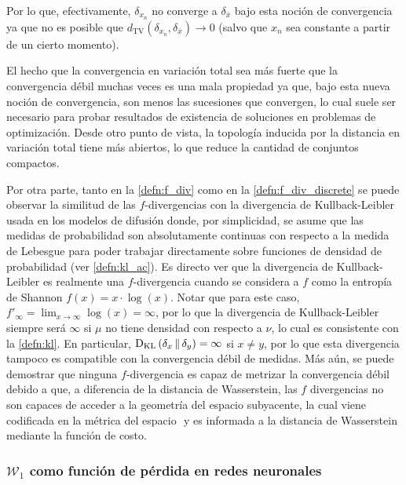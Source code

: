 Por lo que, efectivamente, $\delta_{x_n}$ no converge a $\delta_{\bar x}$ bajo esta noción de convergencia ya que no es posible que $d_{\operatorname{TV}}(\delta_{x_n},\delta_{\bar x})\to 0$ (salvo que $x_n$ sea constante a partir de un cierto momento).

El hecho que la convergencia en variación total sea más fuerte que la convergencia débil muchas veces es una mala propiedad ya que, bajo esta nueva noción de convergencia, son menos las sucesiones que convergen, lo cual suele ser necesario para probar resultados de existencia de soluciones en problemas de optimización. Desde otro punto de vista, la topología inducida por la distancia en variación total tiene más abiertos, lo que reduce la cantidad de conjuntos compactos.

Por otra parte, tanto en la \autoref{defn:f_div} como en la \autoref{defn:f_div_discrete} se puede observar la similitud de las $f$-divergencias con la divergencia de Kullback-Leibler usada en los modelos de difusión donde, por simplicidad, se asume que las medidas de probabilidad son absolutamente continuas con respecto a la medida de Lebesgue para poder trabajar directamente sobre funciones de densidad de probabilidad (ver \autoref{defn:kl_ac}). Es directo ver que la divergencia de Kullback-Leibler es realmente una $f$-divergencia cuando se considera a $f$ como la entropía de Shannon $f(x)=x\cdot\log(x)$. Notar que para este caso, $f'_\infty = \lim_{x\to\infty} \log(x) = \infty$, por lo que la divergencia de Kullback-Leibler siempre será $\infty$ si $\mu$ no tiene densidad con respecto a $\nu$, lo cual es consistente con la \autoref{defn:kl}. En particular, $\operatorname{D_{KL}}\left(\delta_x\,\|\,\delta_y\right)=\infty$ si $x\neq y$, por lo que esta divergencia tampoco es compatible con la convergencia débil de medidas. Más aún, se puede demostrar que ninguna $f$-divergencia es capaz de metrizar la convergencia débil debido a que, a diferencia de la distancia de Wasserstein, las $f$ divergencias no son capaces de acceder a la geometría del espacio subyacente, la cual viene codificada en la métrica del espacio $\xspace$ y es informada a la distancia de Wasserstein mediante la función de costo.

\subsubsection{$\mathcal{W}_1$ como función de pérdida en redes neuronales}


